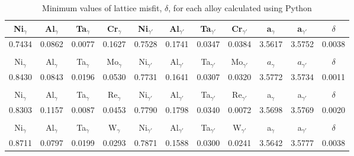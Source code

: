\begin{table}[H]
  \centering
  \begin{tabular}{rrrrrrrrrrr}
    \multicolumn{1}{c}{Ni$_\gamma$} & \multicolumn{1}{c}{Al$_\gamma$} & \multicolumn{1}{c}{Ta$_\gamma$} & \multicolumn{1}{c}{Cr$_\gamma$} & \multicolumn{1}{c}{Ni$_{\gamma'}$} & \multicolumn{1}{c}{Al$_{\gamma'}$} & \multicolumn{1}{c}{Ta$_{\gamma'}$} & \multicolumn{1}{c}{Cr$_{\gamma'}$} & \multicolumn{1}{c}{a$_\gamma$} & \multicolumn{1}{c}{a$_{\gamma'}$} & \multicolumn{1}{c}{$\delta$} \\ \hline \hline
    0.7434 & 0.0862 & 0.0077 & 0.1627 & 0.7528 & 0.1741 & 0.0347 & 0.0384 & 3.5617 & 3.5752 & 0.0038 \\\\
   \multicolumn{1}{c}{Ni$_\gamma$} & \multicolumn{1}{c}{Al$_\gamma$} & \multicolumn{1}{c}{Ta$_\gamma$} & \multicolumn{1}{c}{Mo$_\gamma$} & \multicolumn{1}{c}{Ni$_{\gamma'}$} & \multicolumn{1}{c}{Al$_{\gamma'}$} & \multicolumn{1}{c}{Ta$_{\gamma'}$} & \multicolumn{1}{c}{Mo$_{\gamma'}$} & \multicolumn{1}{c}{$a_\gamma$} & \multicolumn{1}{c}{$a_{\gamma'}$} & \multicolumn{1}{c}{$\delta$} \\ \hline \hline
   0.8430 & 0.0843 & 0.0196 & 0.0530 & 0.7731 & 0.1641 & 0.0307 & 0.0320 & 3.5772 & 3.5734 & 0.0011 \\\\
   \multicolumn{1}{c}{Ni$_\gamma$} & \multicolumn{1}{c}{Al$_\gamma$} & \multicolumn{1}{c}{Ta$_\gamma$} & \multicolumn{1}{c}{Re$_\gamma$} & \multicolumn{1}{c}{Ni$_{\gamma'}$} & \multicolumn{1}{c}{Al$_{\gamma'}$} & \multicolumn{1}{c}{Ta$_{\gamma'}$} & \multicolumn{1}{c}{Re$_{\gamma'}$} & \multicolumn{1}{c}{a$_\gamma$} & \multicolumn{1}{c}{a$_{\gamma'}$} & \multicolumn{1}{c}{$\delta$} \\ \hline \hline
   0.8303 & 0.1157 & 0.0087 & 0.0453 & 0.7790 & 0.1798 & 0.0340 & 0.0072 & 3.5698 & 3.5769 & 0.0020 \\\\
   \multicolumn{1}{c}{Ni$_\gamma$} & \multicolumn{1}{c}{Al$_\gamma$} & \multicolumn{1}{c}{Ta$_\gamma$} & \multicolumn{1}{c}{W$_\gamma$} & \multicolumn{1}{c}{Ni$_{\gamma'}$} & \multicolumn{1}{c}{Al$_{\gamma'}$} & \multicolumn{1}{c}{Ta$_{\gamma'}$} & \multicolumn{1}{c}{W$_{\gamma'}$} & \multicolumn{1}{c}{a$_\gamma$} & \multicolumn{1}{c}{a$_{\gamma'}$} & \multicolumn{1}{c}{$\delta$} \\ \hline \hline
   0.8711 & 0.0797 & 0.0199 & 0.0293 & 0.7871 & 0.1588 & 0.0300 & 0.0241 & 3.5642 & 3.5777 & 0.0038
  \end{tabular}
  \caption{Minimum values of lattice misfit, $\delta$, for each alloy calculated using Python \citep{mygit}}
  \label{tab:tab08}
\end{table}

